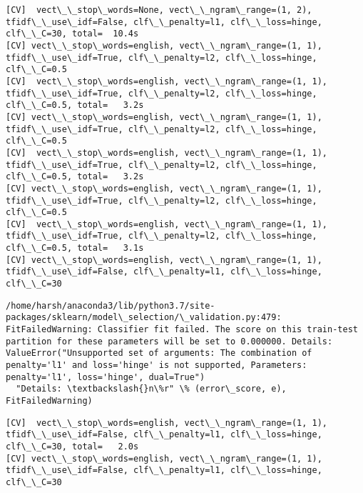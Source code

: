 \documentclass[11pt]{article}
\begin{document}
    \begin{Verbatim}[commandchars=\\\{\}]
[CV]  vect\_\_stop\_words=None, vect\_\_ngram\_range=(1, 2), tfidf\_\_use\_idf=False, clf\_\_penalty=l1, clf\_\_loss=hinge, clf\_\_C=30, total=  10.4s
[CV] vect\_\_stop\_words=english, vect\_\_ngram\_range=(1, 1), tfidf\_\_use\_idf=True, clf\_\_penalty=l2, clf\_\_loss=hinge, clf\_\_C=0.5 
[CV]  vect\_\_stop\_words=english, vect\_\_ngram\_range=(1, 1), tfidf\_\_use\_idf=True, clf\_\_penalty=l2, clf\_\_loss=hinge, clf\_\_C=0.5, total=   3.2s
[CV] vect\_\_stop\_words=english, vect\_\_ngram\_range=(1, 1), tfidf\_\_use\_idf=True, clf\_\_penalty=l2, clf\_\_loss=hinge, clf\_\_C=0.5 
[CV]  vect\_\_stop\_words=english, vect\_\_ngram\_range=(1, 1), tfidf\_\_use\_idf=True, clf\_\_penalty=l2, clf\_\_loss=hinge, clf\_\_C=0.5, total=   3.2s
[CV] vect\_\_stop\_words=english, vect\_\_ngram\_range=(1, 1), tfidf\_\_use\_idf=True, clf\_\_penalty=l2, clf\_\_loss=hinge, clf\_\_C=0.5 
[CV]  vect\_\_stop\_words=english, vect\_\_ngram\_range=(1, 1), tfidf\_\_use\_idf=True, clf\_\_penalty=l2, clf\_\_loss=hinge, clf\_\_C=0.5, total=   3.1s
[CV] vect\_\_stop\_words=english, vect\_\_ngram\_range=(1, 1), tfidf\_\_use\_idf=False, clf\_\_penalty=l1, clf\_\_loss=hinge, clf\_\_C=30 

    \end{Verbatim}

    \begin{Verbatim}[commandchars=\\\{\}]
/home/harsh/anaconda3/lib/python3.7/site-packages/sklearn/model\_selection/\_validation.py:479: FitFailedWarning: Classifier fit failed. The score on this train-test partition for these parameters will be set to 0.000000. Details: 
ValueError("Unsupported set of arguments: The combination of penalty='l1' and loss='hinge' is not supported, Parameters: penalty='l1', loss='hinge', dual=True")
  "Details: \textbackslash{}n\%r" \% (error\_score, e), FitFailedWarning)

    \end{Verbatim}

    \begin{Verbatim}[commandchars=\\\{\}]
[CV]  vect\_\_stop\_words=english, vect\_\_ngram\_range=(1, 1), tfidf\_\_use\_idf=False, clf\_\_penalty=l1, clf\_\_loss=hinge, clf\_\_C=30, total=   2.0s
[CV] vect\_\_stop\_words=english, vect\_\_ngram\_range=(1, 1), tfidf\_\_use\_idf=False, clf\_\_penalty=l1, clf\_\_loss=hinge, clf\_\_C=30 

    \end{Verbatim}
\end{document}
